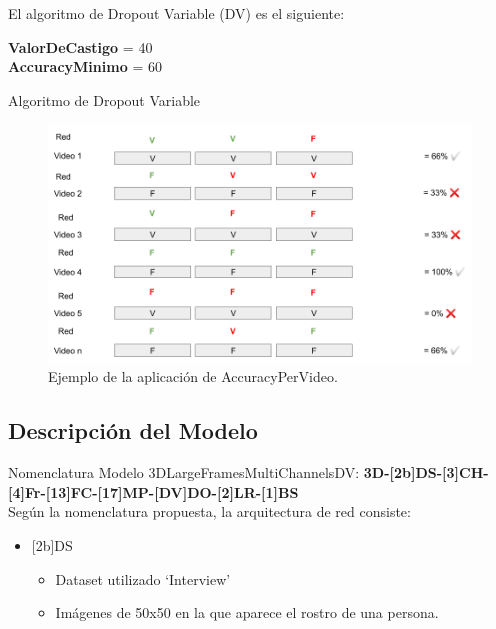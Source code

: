 \begin{onehalfspacing}
El algoritmo de Dropout Variable (DV) es el siguiente:\\

\begin{algorithm}[h!]
\SetAlgoLined
{}
 \textbf{ValorDeCastigo} = 40\\
 \textbf{AccuracyMinimo} = 60\\
 \caption{Algoritmo de Dropout Variable}
 \label{alg:DV}
\end{algorithm}

\begin{figure}[th]
	\centering
	\includegraphics[width=16cm,keepaspectratio]{XX_Figures/Fig_AccuracyPerVideoEjemplo.png}
	\caption{\footnotesize Ejemplo de la aplicación de AccuracyPerVideo.}
	\label{fig:Fig_AccuracyPerVideoEjemplo}
\end{figure}

\subsection{Descripción del Modelo}
\label{sec:Descripcion3DLargeFramesMultiChannelsDV}

Nomenclatura Modelo 3DLargeFramesMultiChannelsDV: \textbf{3D-[2b]DS-[3]CH-[4]Fr-[13]FC-[17]MP-[DV]DO-[2]LR-[1]BS}\\

Según la nomenclatura propuesta, la arquitectura de red consiste:\\

\begin{itemize}
    \item {[2b]DS}
        \begin{itemize}
            \item Dataset utilizado `Interview'
            \item Imágenes de 50x50 en la que aparece el rostro de una persona.
    \end{itemize}
    

\end{itemize}
\end{onehalfspacing}
